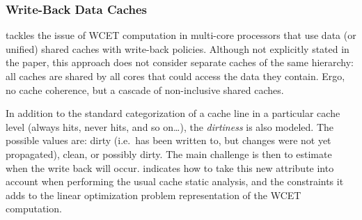 \subsubsection{Write-Back Data Caches}
\cite{10.1145/3139258.3139269} tackles the issue of WCET computation in
multi-core processors that use data (or unified) shared caches with write-back
policies. Although not explicitly stated in the paper, this approach does not
consider separate caches of the same hierarchy: all caches are shared by all
cores that could access the data they contain. Ergo, no cache coherence, but a
cascade of non-inclusive shared caches.

In addition to the standard categorization of a cache line in a particular
cache level (always hits, never hits, and so on\ldots), the \textit{dirtiness}
is also modeled. The possible values are: dirty (i.e.~has been written to, but
changes were not yet propagated), clean, or possibly dirty. The main challenge
is then to estimate when the write back will occur.
\cite{10.1145/3139258.3139269} indicates how to take this new attribute into
account when performing the usual cache static analysis, and the constraints it
adds to the linear optimization problem representation of the WCET computation.


